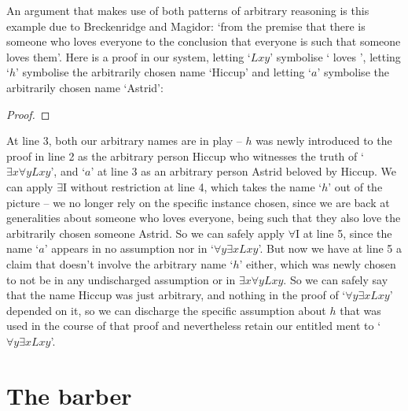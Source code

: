 An argument that makes use of both patterns of arbitrary reasoning is this example due to Breckenridge and Magidor: `from the premise that there is someone who loves everyone to the conclusion that everyone is such that someone loves them'. Here is a proof in our system, letting `$Lxy$' symbolise ` loves ', letting `$h$' symbolise the arbitrarily chosen name `Hiccup' and letting `$a$' symbolise the arbitrarily chosen name `Astrid': \begin{proof}
	\open
	\close
\end{proof} At line 3, both our arbitrary names are in play – $h$ was newly introduced to the proof in line 2 as the arbitrary person Hiccup who witnesses the truth of `$\exists x \forall y Lxy$', and `$a$' at line 3 as an arbitrary person Astrid beloved by Hiccup. We can apply $\exists$I without restriction at line 4, which takes the name `$h$' out of the picture – we no longer rely on the specific instance chosen, since we are back at generalities about someone who loves everyone, being such that they also love the arbitrarily chosen someone Astrid. So we can safely apply $\forall$I at line 5, since the name `$a$' appears in no assumption nor in `$\forall y\exists x Lxy$'. But now we have at line 5 a claim that doesn't involve the arbitrary name `$h$' either, which was newly chosen to not be in any undischarged assumption or in $\exists x \forall y Lxy$. So we can safely say that the name Hiccup was just arbitrary, and nothing in the proof of `$\forall y\exists x Lxy$' depended on it, so we can discharge the specific assumption about $h$ that was used in the course of that proof and nevertheless retain our entitled ment to `$\forall y\exists x Lxy$'. 

\section{The barber}\label{barber}

